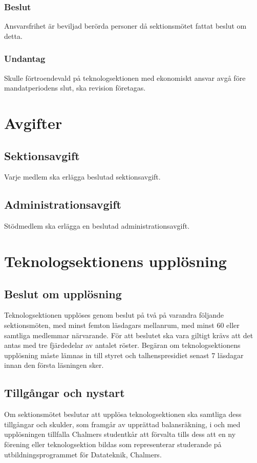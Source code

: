\documentclass[a4paper]{dtek}
\begin{document}
\subsubsection{Beslut}
Ansvarsfrihet är beviljad berörda personer då sektionsmötet fattat beslut om detta.
\subsubsection{Undantag}
Skulle förtroendevald på teknologsektionen med ekonomiskt ansvar avgå före mandatperiodens slut, ska revision företagas.
\newpage

\section{Avgifter}
\subsection{Sektionsavgift}
Varje medlem ska erlägga beslutad sektionsavgift.
\subsection{Administrationsavgift}
Stödmedlem ska erlägga en beslutad administrationsavgift.
\newpage

\section{Teknologsektionens upplösning}
\subsection{Beslut om upplösning}
Teknologsektionen upplöses genom beslut på två på varandra följande sektionsmöten, med minst femton läsdagars mellanrum, med minst 60 eller samtliga medlemmar närvarande. För att beslutet ska vara giltigt krävs att det antas med tre fjärdedelar av antalet röster. Begäran om teknologsektionens upplösning måste lämnas in till styret och talhenspresidiet senast 7 läsdagar innan den första läsningen sker.
\subsection{Tillgångar och nystart}
Om sektionsmötet beslutar att upplösa teknologsektionen ska samtliga dess tillgångar och skulder, som framgår av upprättad balansräkning, i och med upplösningen tillfalla Chalmers studentkår att förvalta tills dess att en ny förening eller teknologsektion bildas som representerar studerande på utbildningsprogrammet för Datateknik, Chalmers.
\newpage
\end{document}
